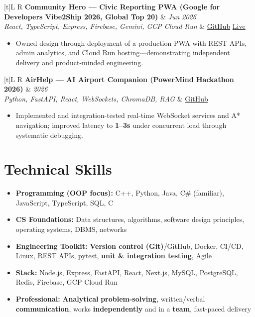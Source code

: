\documentclass[a4paper,10pt]{article}
\newcommand{\resumeProject}[4]{%
  \vspace{0.5mm}
  \noindent
  \begin{tabularx}{\textwidth}[t]{L R}
    \textbf{#1} & \textit{#3} \\
    \textit{#2} & #4 \\
  \end{tabularx}
  \vspace{-0.5mm}%
}
\begin{document}
\resumeProject
  {Community Hero --- Civic Reporting PWA (Google for Developers Vibe2Ship 2026, Global Top 20)}
  {React, TypeScript, Express, Firebase, Gemini, GCP Cloud Run}
  {Jun 2026}
  {\href{https://github.com/Ojas-Srivastava05/community-hero}{GitHub} \textbar{} \href{https://community-hero-987477089222.asia-south1.run.app}{Live}}
\begin{itemize}
  \item Owned design through deployment of a production PWA with REST APIs, admin analytics, and Cloud Run hosting---demonstrating independent delivery and product-minded engineering.
\end{itemize}

\resumeProject
  {AirHelp --- AI Airport Companion (PowerMind Hackathon 2026)}
  {Python, FastAPI, React, WebSockets, ChromaDB, RAG}
  {2026}
  {\href{https://github.com/Ojas-Srivastava05/AirHelp-AI-Airport-Assistant}{GitHub}}
\begin{itemize}
  \item Implemented and integration-tested real-time WebSocket services and A* navigation; improved latency to \textbf{1--3s} under concurrent load through systematic debugging.
\end{itemize}

\section{Technical Skills}
\small
\begin{itemize}[label={}]
  \item \textbf{Programming (OOP focus):} C++, Python, Java, C\# (familiar), JavaScript, TypeScript, SQL, C
  \item \textbf{CS Foundations:} Data structures, algorithms, software design principles, operating systems, DBMS, networks
  \item \textbf{Engineering Toolkit:} \textbf{Version control (Git)}/GitHub, Docker, CI/CD, Linux, REST APIs, pytest, \textbf{unit \& integration testing}, Agile
  \item \textbf{Stack:} Node.js, Express, FastAPI, React, Next.js, MySQL, PostgreSQL, Redis, Firebase, GCP Cloud Run
  \item \textbf{Professional:} \textbf{Analytical} \textbf{problem-solving}, written/verbal \textbf{communication}, works \textbf{independently} and in a \textbf{team}, fast-paced delivery
\end{itemize}
\end{document}
